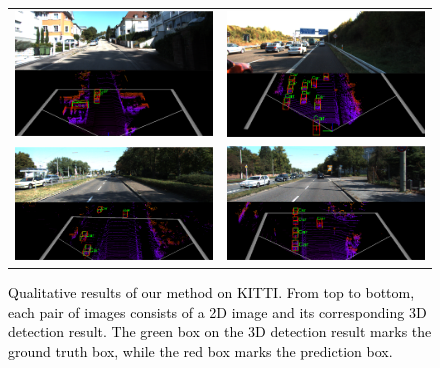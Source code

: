 \begin{sloppypar}
\begin{figure}
        \center
        \scriptsize
        \begin{tabular}{cc}
                \includegraphics[width=8cm]{./kitti/1.png} &
                \includegraphics[width=8cm]{./kitti/2.png} \\
                
                \includegraphics[width=8cm]{./kitti/3.png}  &  
                \includegraphics[width=8cm]{./kitti/4.png}  \\
        \end{tabular}
        \caption{\textcolor{black}{Qualitative results of our method on KITTI. From top to bottom, each pair of images consists of a 2D image and its corresponding 3D detection result. The green box on the 3D detection result marks the ground truth box, while the red box marks the prediction box. }}
        \label{figure10}
        \vspace{-0.5em}
\end{figure}


\end{sloppypar}
